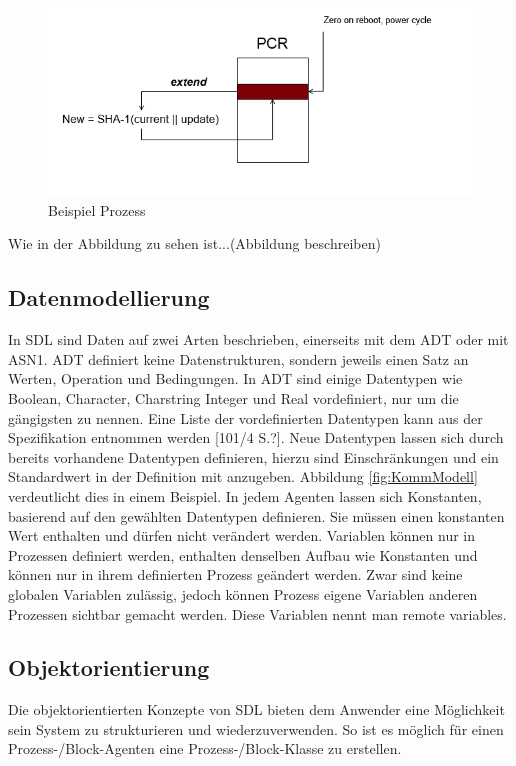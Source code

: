 \begin{figure}[ht]
	\centering
	\includegraphics[width=1\textwidth]{test.png}
	\caption{Beispiel Prozess}
	\label{fig:BspProzess}
\end{figure}

Wie in der Abbildung zu sehen ist...(Abbildung beschreiben)

\subsection{Datenmodellierung}
\label{ssc:Daten}
In \ac{SDL} sind Daten auf zwei Arten beschrieben, einerseits mit dem \acs{ADT} oder mit \ac{ASN1}. \ac{ADT} definiert keine Datenstrukturen, sondern jeweils einen Satz an Werten, Operation und Bedingungen. In \ac{ADT} sind einige Datentypen wie Boolean, Character, Charstring Integer und Real vordefiniert, nur um die gängigsten zu nennen. Eine Liste der vordefinierten Datentypen kann aus der Spezifikation entnommen werden [101/4 S.?]. Neue Datentypen lassen sich durch bereits vorhandene Datentypen definieren, hierzu sind Einschränkungen und ein Standardwert in der Definition mit anzugeben. Abbildung \ref{fig:KommModell} verdeutlicht dies in einem Beispiel. In jedem Agenten lassen sich Konstanten, basierend auf den gewählten Datentypen definieren. Sie müssen einen konstanten Wert enthalten und dürfen nicht verändert werden. Variablen können nur in Prozessen definiert werden, enthalten denselben Aufbau wie Konstanten und können nur in ihrem definierten Prozess geändert werden. Zwar sind keine globalen Variablen zulässig, jedoch können Prozess eigene Variablen anderen Prozessen sichtbar gemacht werden. Diese Variablen nennt man remote variables.

\subsection{Objektorientierung} 
\label{ssc:Vererbung}
Die objektorientierten Konzepte von \ac{SDL} bieten dem Anwender eine Möglichkeit sein System zu strukturieren und wiederzuverwenden. So ist es möglich für einen Prozess-/Block-Agenten eine Prozess-/Block-Klasse zu erstellen.

